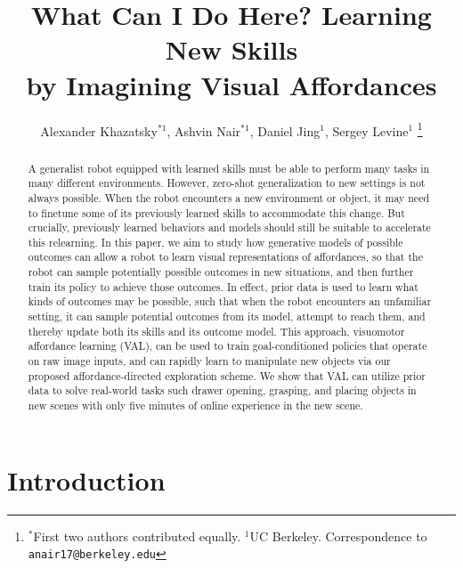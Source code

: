 \documentclass[letterpaper, 10 pt, conference]{ieeeconf}  %
\title{\LARGE \bf
What Can I Do Here? Learning New Skills \\ by Imagining Visual Affordances
}
\author{Alexander Khazatsky$^{*1}$, Ashvin Nair$^{*1}$, Daniel Jing$^1$, Sergey Levine$^1$
\thanks{$^*$First two authors contributed equally. $^1$UC Berkeley. Correspondence to {\tt\small anair17@berkeley.edu} }
}
\begin{document}
\maketitle
\thispagestyle{empty}
\pagestyle{empty}


\begin{abstract}
A generalist robot equipped with learned skills must be able to perform many tasks in many different environments. However, zero-shot generalization to new settings is not always possible. When the robot encounters a new environment or object, it may need to finetune some of its previously learned skills to accommodate this change. But crucially, previously learned behaviors and models should still be suitable to accelerate this relearning. In this paper, we aim to study how generative models of possible outcomes can allow a robot to learn visual representations of affordances, so that the robot can sample potentially possible outcomes in new situations, and then further train its policy to achieve those outcomes. In effect, prior data is used to learn what kinds of outcomes may be possible, such that when the robot encounters an unfamiliar setting, it can sample potential outcomes from its model, attempt to reach them, and thereby update both its skills and its outcome model. This approach, visuomotor affordance learning (VAL), can be used to train goal-conditioned policies that operate on raw image inputs, and can rapidly learn to manipulate new objects via our proposed affordance-directed exploration scheme. We show that VAL can utilize prior data to solve real-world tasks such drawer opening, grasping, and placing objects in new scenes with only five minutes of online experience in the new scene.
\end{abstract}

\section{Introduction}
\end{document}

